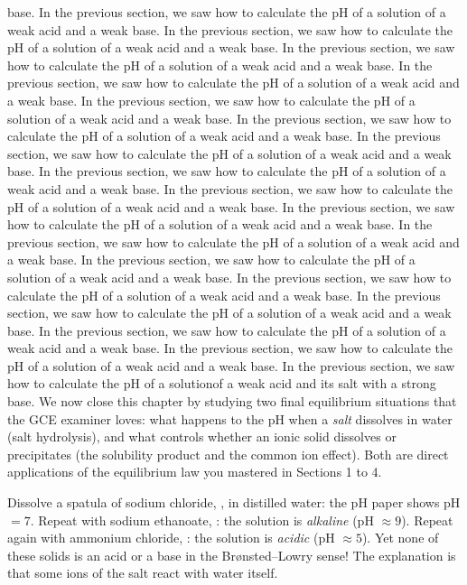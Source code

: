 \documentclass[11pt]{article}
\newcounter{popsec}
\newcounter{popsub}
\newcommand{\courssub}[1]{%
  \stepcounter{popsub}%
  \par\vspace{9pt}\noindent{\popxbold\fontsize{11.5}{13}\selectfont\color{popink}{\color{poporange}\thepopsec.\thepopsub}\hspace{6pt}#1}\par\nopagebreak\vspace{4pt}
}
\begin{document}
base. In the previous section, we saw how to calculate the pH of a solution of a weak acid and a weak base. In the previous section, we saw how to calculate the pH of a solution of a weak acid and a weak base. In the previous section, we saw how to calculate the pH of a solution of a weak acid and a weak base. In the previous section, we saw how to calculate the pH of a solution of a weak acid and a weak base. In the previous section, we saw how to calculate the pH of a solution of a weak acid and a weak base. In the previous section, we saw how to calculate the pH of a solution of a weak acid and a weak base. In the previous section, we saw how to calculate the pH of a solution of a weak acid and a weak base. In the previous section, we saw how to calculate the pH of a solution of a weak acid and a weak base. In the previous section, we saw how to calculate the pH of a solution of a weak acid and a weak base. In the previous section, we saw how to calculate the pH of a solution of a weak acid and a weak base. In the previous section, we saw how to calculate the pH of a solution of a weak acid and a weak base. In the previous section, we saw how to calculate the pH of a solution of a weak acid and a weak base. In the previous section, we saw how to calculate the pH of a solution of a weak acid and a weak base. In the previous section, we saw how to calculate the pH of a solution of a weak acid and a weak base. In the previous section, we saw how to calculate the pH of a solution of a weak acid and a weak base. In the previous section, we saw how to calculate the pH of a solution of a weak acid and a weak base. In the previous section, we saw how to calculate the pH of a solutionof a weak acid and its salt with a strong base. We now close this chapter by studying two final equilibrium situations that the GCE examiner loves: what happens to the pH when a \emph{salt} dissolves in water (salt hydrolysis), and what controls whether an ionic solid dissolves or precipitates (the solubility product and the common ion effect). Both are direct applications of the equilibrium law you mastered in Sections 1 to 4.

\courssub{Salt Hydrolysis}

\begin{experience}
Dissolve a spatula of sodium chloride, , in distilled water: the pH paper shows pH $= 7$. Repeat with sodium ethanoate, : the solution is \emph{alkaline} (pH $\approx 9$). Repeat again with ammonium chloride, : the solution is \emph{acidic} (pH $\approx 5$). Yet none of these solids is an acid or a base in the Br\o nsted--Lowry sense! The explanation is that some ions of the salt react with water itself.
\end{experience}
\end{document}
